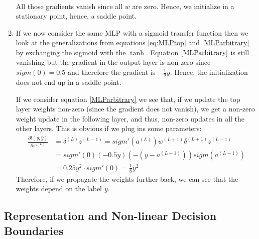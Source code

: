 \documentclass[12pt]{article}
\begin{document}
\begin{enumerate}
\begin{align}
	\end{align}
	All those gradients vanish since all $w$ are zero. Hence, we initialize in a stationary point, hence, a saddle point.
	\item If we now consider the same MLP with a sigmoid transfer function then we look at the generalizations from equations \eqref{eq:MLPtop} and \eqref{MLParbitrary} by exchanging the sigmoid with the $\tanh$. Equation $\ref{MLParbitrary}$ is still vanishing but the gradient in the output layer is non-zero since $sigm(0) = 0.5$ and therefore the gradient is $-\frac{1}{2}y$. Hence, the initialization does not end up in a saddle point. \par 
	If we consider equation \ref{MLParbitrary} we see that, if we update the top layer weights non-zero (since the gradient does not vanish), we get a non-zero weight update in the following layer, and thus, non-zero updates in all the other layers. This is obvious if we plug ins some parameters:
	\begin{align}
		\frac{\partial l(y,\hat{y})}{\partial w^{(L)}} &= \delta^{(L)} z^{(L-1)} = sigm'(a^{(L)})w^{(L+1)}\delta^{(L+1)}z^{(L-1)}\\ &= sigm'(0)(-0.5y)(-(y-a^{(L+1)}))sigm(a^{(L-1)})\\
		&= 0.25y^2 \cdot sigm'(0) = \frac{1}{8}y^2
	\end{align}
	Therefore, if we propagate the weights further back, we can see that the weights depend on the label $y$.
\end{enumerate}

\subsection{Representation and Non-linear Decision Boundaries}
\end{document}

